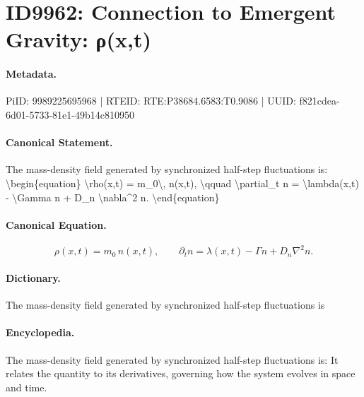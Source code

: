 \section*{ID9962: Connection to Emergent Gravity: ρ(x,t)}
\paragraph{Metadata.}
PiID: 9989225695968 | RTEID: RTE:P38684.6583:T0.9086 | UUID: f821cdea-6d01-5733-81e1-49b14c810950

\paragraph{Canonical Statement.}
The mass-density field generated by synchronized half-step fluctuations is: \textbackslash{}begin\{equation\} \textbackslash{}rho(x,t) = m\_0\textbackslash{}, n(x,t), \textbackslash{}qquad \textbackslash{}partial\_t n = \textbackslash{}lambda(x,t) - \textbackslash{}Gamma n + D\_n \textbackslash{}nabla\textasciicircum{}2 n. \textbackslash{}end\{equation\}

\paragraph{Canonical Equation.}
\[
\rho(x,t) = m_0\, n(x,t), \qquad \partial_t n = \lambda(x,t) - \Gamma n + D_n \nabla^2 n.
\]

\paragraph{Dictionary.}
The mass-density field generated by synchronized half-step fluctuations is

\paragraph{Encyclopedia.}
The mass-density field generated by synchronized half-step fluctuations is: It relates the quantity to its derivatives, governing how the system evolves in space and time.
